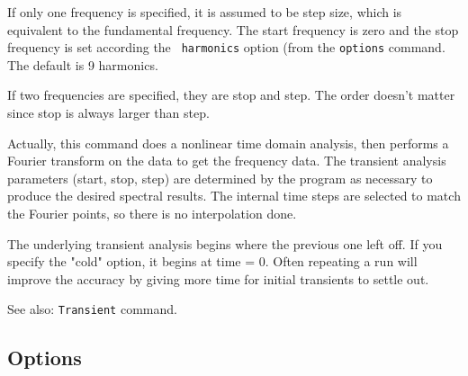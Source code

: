 If only one frequency is specified, it is assumed to be step size,
which is equivalent to the fundamental frequency.  The start
frequency is zero and the stop frequency is set according the {\tt
harmonics} option (from the {\tt options} command.  The default is
9 harmonics.

If two frequencies are specified, they are stop and step.  The
order doesn't matter since stop is always larger than step.

Actually, this command does a nonlinear time domain analysis, then
performs a Fourier transform on the data to get the frequency data.
The transient analysis parameters (start, stop, step) are determined
by the program as necessary to produce the desired spectral results.
The internal time steps are selected to match the Fourier points,
so there is no interpolation done.

The underlying transient analysis begins where the previous one
left off.  If you specify the "cold" option, it begins at time =
0.  Often repeating a run will improve the accuracy by giving more
time for initial transients to settle out.

See also: {\tt Transient} command.
\subsection{Options}


